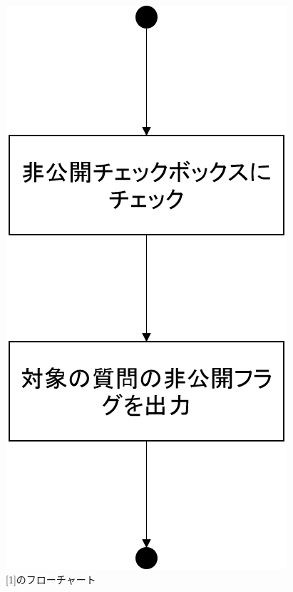 \begin{figure}[htbp]
  \begin{center}
    \includegraphics[width=0.3\linewidth,clip]{./img/q_reply/sub1.png}
    \caption{[1]のフローチャート}\label{fig:qreplyflow0}
  \end{center}
\end{figure}

